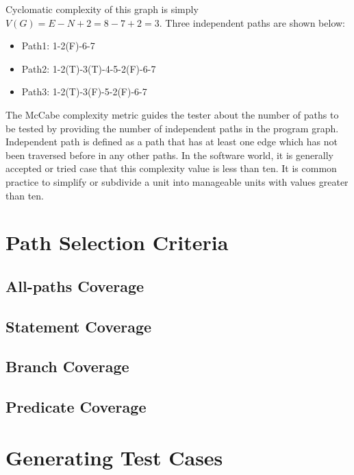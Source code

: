 Cyclomatic complexity of this graph is simply $V(G) = E - N + 2 = 8 - 7 + 2 = 3$. Three independent paths are shown below:
\begin{itemize}
    \item Path1: 1-2(F)-6-7
    \item Path2: 1-2(T)-3(T)-4-5-2(F)-6-7
    \item Path3: 1-2(T)-3(F)-5-2(F)-6-7
\end{itemize}

The McCabe complexity metric guides the tester about the number of paths to be tested by providing the number of independent paths in the program graph. Independent path is defined as a path that has at least one edge which has not been traversed before in any other paths. In the  software world, it is generally accepted or tried case that this complexity value is less than ten. It is common practice to simplify or subdivide a unit into manageable units with values greater than ten.

\section{Path Selection Criteria}

\subsection{All-paths Coverage}

\subsection{Statement Coverage}

\subsection{Branch Coverage}

\subsection{Predicate Coverage}

\section{Generating Test Cases}

